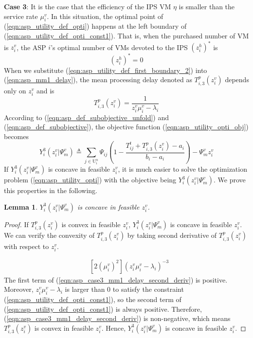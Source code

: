 \documentclass[conference]{IEEEtran}
\newtheorem{lemma}{Lemma}
\begin{document}
\textbf{Case 3}: It is the case that the efficiency of the IPS VM $\eta$ is smaller than the service rate $\mu_i^v$. In this situation, the optimal point of (\ref{eqn:asp_utility_def_opti}) happens at the left boundary of (\ref{eqn:asp_utility_def_opti_const1}). That is, when the purchased number of VM is $z_i^v$, the ASP $i$'s optimal number of VMs devoted to the IPS $(z_i^h)^*$ is
\begin{equation} \label{eqn:asp_utility_def_first_boundary_2}
(z_i^h)^* = 0
\end{equation}
When we substitute (\ref{eqn:asp_utility_def_first_boundary_2}) into (\ref{eqn:asp_mm1_delay}), the mean processing delay denoted as $T_{i,3}^p(z_i^v)$ depends only on $z_i^v$ and is
\begin{equation}\label{eqn:asp_case3_mm1_delay}
T_{i,3}^p(z_i^v) = \frac{1}{z_i^v \mu_i^v-\lambda_i}
\end{equation}
According to (\ref{eqn:asp_def_subobjective_unfold}) and (\ref{eqn:asp_def_subobjective}), the objective function (\ref{eqn:asp_utility_opti_obj}) becomes
\begin{equation}\label{eqn:asp_case3_objective}
Y_i^3(z_i^v|\Psi_m^v) \triangleq \sum_{j \in \mathrm{U}_i^n}\Psi_{ij}(1-\frac{T_{ij}^t + T_{i,3}^p(z_i^v)-a_i}{b_i-a_i}) - \Psi_m^vz_i^v
\end{equation}
If $Y_i^3(z_i^v|\Psi_m^v)$ is concave in feasible $z_i^v$, it is much easier to solve the optimization problem (\ref{eqn:asp_utility_opti}) with the objective being $Y_i^3(z_i^v|\Psi_m^v)$. We prove this properties in the following.
\begin{lemma} \label{lemma:asp_case3_utility_concave}
$Y_i^3(z_i^v|\Psi_m^v)$ is concave in feasible $z_i^v$.
\end{lemma}
\begin{proof}
If $T_{i,3}^p(z_i^v)$ is convex in feasible $z_i^v$, $Y_i^3(z_i^v|\Psi_m^v)$ is concave in feasible $z_i^v$. We can verify the convexity of $T_{i,3}^p(z_i^v)$ by taking second derivative of $T_{i,3}^p(z_i^v)$ with respect to $z_i^v$.

\begin{equation} \label{eqn:asp_case3_mm1_delay_second_deriv}
\begin{aligned}
&[2(\mu_i^v)^2](z_i^v\mu_i^v-\lambda_i)^{-3}
\end{aligned}
\end{equation}
The first term of (\ref{eqn:asp_case3_mm1_delay_second_deriv}) is positive. Moreover, $z_i^v\mu_i^v - \lambda_i$ is larger than $0$ to satisfy the constraint (\ref{eqn:asp_utility_def_opti_const1}), so the second term of (\ref{eqn:asp_utility_def_opti_const1}) is always positive. Therefore, (\ref{eqn:asp_case3_mm1_delay_second_deriv}) is non-negative, which means $T_{i,3}^p(z_i^v)$ is convex in feasible $z_i^v$. Hence, $Y_i^3(z_i^v|\Psi_m^v)$ is concave in feasible $z_i^v$. \qedhere
\end{proof}
\end{document}
